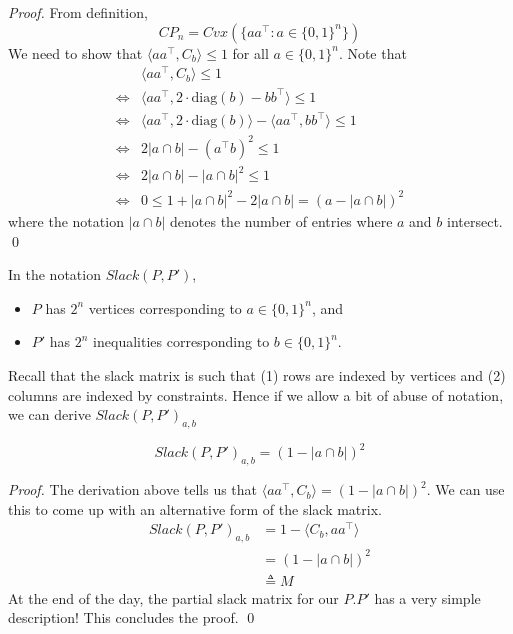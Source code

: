\begin{proof}
	From definition, 
	\begin{equation}
		CP_n = Cvx ( \{ aa^\top : a \in \{0, 1\} ^n \} )
	\end{equation}
	We need to show that $\langle aa^\top , C_b \rangle \leq 1$ for all $a \in \{0, 1\} ^n $. Note that
	\begin{align}
		& \langle aa^\top, C_b \rangle \leq 1 \\
		\iff & \langle aa^\top , 2 \cdot \mathrm{diag} (b) - bb^\top \rangle \leq 1 \\
		\iff & \langle aa^\top , 2 \cdot \mathrm{diag} (b) \rangle - \langle aa^\top, bb^\top \rangle \leq 1 \\
		\iff & 2 |a \cap b | - (a^\top b ) ^2 \leq 1 \\
		\iff & 2 |a \cap b | - |a \cap b | ^2 \leq 1 \\
		\iff & 0 \leq 1 + |a \cap b|^2 - 2 |a \cap b| 
				= ( a - |a \cap b| ) ^ 2
	\end{align}
	where the notation $|a \cap b |$ denotes the number of entries where $a$ and $b$ intersect. \qed
\end{proof}

In the notation $Slack(P, P')$, 
\begin{itemize}
	\item $P$ has $2^n$ vertices corresponding to $a \in \{0, 1\}^n$, and 
	\item $P'$ has $2^n$ inequalities corresponding to $b \in \{0, 1\}^n$. 
\end{itemize}

Recall that the slack matrix is such that (1) rows are indexed by vertices and (2) columns are indexed by constraints. Hence if we allow a bit of abuse of notation, we can derive $Slack(P, P')_{a, b}$  
\begin{proposition}
	\begin{equation}
		Slack(P, P')_{a, b}  = (1 - |a \cap b |) ^ 2
	\end{equation}
\end{proposition}
\begin{proof}
	The derivation above tells us that $\langle aa^\top, C_b \rangle = (1 - |a \cap b| ) ^2$. We can use this to come up with an alternative form of the slack matrix. 
	\begin{align}
		Slack(P, P')_{a, b} 
		&= 1 - \langle C_b, aa^\top \rangle \\
		&= (1 - |a \cap b |) ^ 2 \\
		&\triangleq M
	\end{align}
	At the end of the day, the partial slack matrix for our $P. P'$ has a very simple description! This concludes the proof. \qed
\end{proof}

